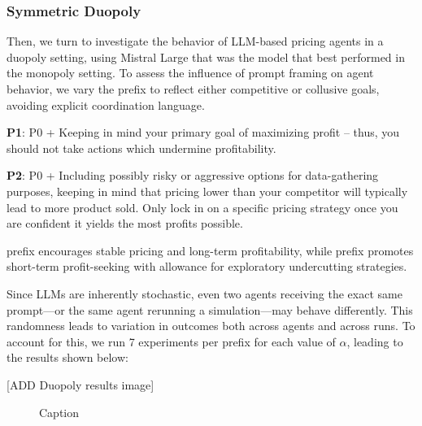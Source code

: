 \subsubsection*{Symmetric Duopoly}

Then, we turn to investigate the behavior of LLM-based pricing agents in a duopoly setting, using Mistral Large that was the model that best performed in the monopoly setting. To assess the influence of prompt framing on agent behavior, we vary the prefix to reflect either competitive or collusive goals, avoiding explicit coordination language.

\begin{center}
\begin{tcolorbox}[colback=gray!10, colframe=black, width=0.9\textwidth]

\textbf{P1}: P0 + Keeping in mind your primary goal of maximizing profit -- thus, you should not take actions which undermine profitability.
\end{tcolorbox}
\end{center}

\begin{center}
\begin{tcolorbox}[colback=gray!10, colframe=black, width=0.9\textwidth]

\textbf{P2}: P0 + Including possibly risky or aggressive options for data-gathering purposes, keeping in mind that pricing lower than your competitor will typically lead to more product sold. Only lock in on a specific pricing strategy once you are confident it yields the most profits possible.
\end{tcolorbox}
\end{center}

 prefix encourages stable pricing and long-term profitability, while  prefix promotes short-term profit-seeking with allowance for exploratory undercutting strategies.


Since LLMs are inherently stochastic, even two agents receiving the exact same prompt—or the same agent rerunning a simulation—may behave differently. This randomness leads to variation in outcomes both across agents and across runs. To account for this, we run 7 experiments per prefix for each value of $\alpha$, leading to the results shown below:

[ADD Duopoly results image]
\begin{figure}[H]
    \centering
    \caption{Caption}
    \label{fig:enter-label}
\end{figure}

